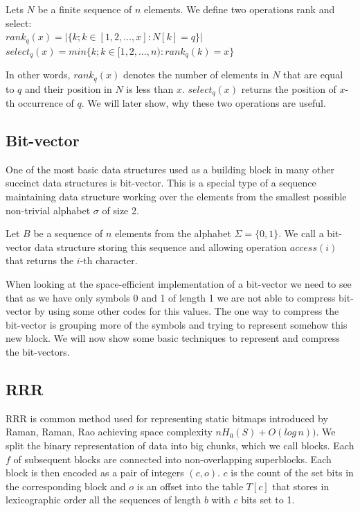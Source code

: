 \begin{theorem}
Lets $N$ be a finite sequence of $n$ elements.
We define two operations rank and select: \\
$rank_q(x) = | \{k; k \in [ 1, 2, \ldots, x] : N[k] = q  \} |$ \\
$select_q(x) = min \{k; k \in [ 1, 2, \ldots, n) : rank_q(k)=x  \} $
\end{theorem}

In other words, $rank_q(x)$ denotes the number of elements in $N$ that are equal to $q$ and their position in $N$ is less than $x$. $select_q(x)$ returns the position of $x$-th occurrence of $q$. We will later show, why these two operations are useful.

\subsection{Bit-vector}

One of the most basic data structures used as a building block in many other succinct data structures is bit-vector. This is a special type of a sequence maintaining data structure working over the elements from the smallest possible non-trivial alphabet $\sigma$ of size 2.

\begin{theorem}
Let $B$ be a sequence of $n$ elements from the alphabet $\Sigma = \{0, 1\}$. We call a bit-vector data structure storing this sequence
and allowing operation $access(i)$ that returns the $i$-th character.
\end{theorem}

When looking at the space-efficient implementation of a bit-vector we need to see that as we have only symbols 0 and 1 of length 1 we are not able to compress bit-vector by using some other codes for this values. The one way to compress the bit-vector is grouping more of the symbols and trying to represent somehow this new block. We will now show some basic techniques to represent and compress the bit-vectors. 

\subsection{RRR}

RRR is common method used for representing static bitmaps introduced by Raman, Raman, Rao \cite{raman2007succinct} achieving space complexity $nH_0(S) + O(log\,n))$. We split the binary representation of data into big chunks, which we call blocks.
Each $f$ of subsequent blocks are connected into non-overlapping superblocks. Each block is then encoded as a pair of integers $(c, o)$. $c$
is the count of the set bits in the corresponding block and $o$ is an offset into the table $T[c]$ that stores in lexicographic order all the sequences of
length $b$ with $c$ bits set to 1.

